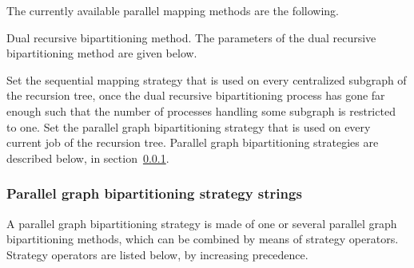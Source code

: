 The currently available parallel mapping methods are the following.
\begin{itemize}
\iteme[{\tt r}]
Dual recursive bipartitioning method. The parameters of the dual recursive
bipartitioning method are given below.
\begin{itemize}
\iteme[{\tt seq=}{\it strat}]
Set the sequential mapping strategy that is used on every centralized
subgraph of the recursion tree, once the dual recursive bipartitioning
process has gone far enough such that the number of processes handling
some subgraph is restricted to one.
\iteme[{\tt sep=}{\it strat}]
Set the parallel graph bipartitioning strategy that is used on every
current job of the recursion tree. Parallel graph bipartitioning
strategies are described below, in section~\ref{sec-lib-format-pbipart}.
\end{itemize}
\end{itemize}

\subsubsection{Parallel graph bipartitioning strategy strings}
\label{sec-lib-format-pbipart}

A parallel graph bipartitioning strategy is made of one or several
parallel graph bipartitioning methods, which can be combined by means
of strategy operators. Strategy operators are listed below, by
increasing precedence.

